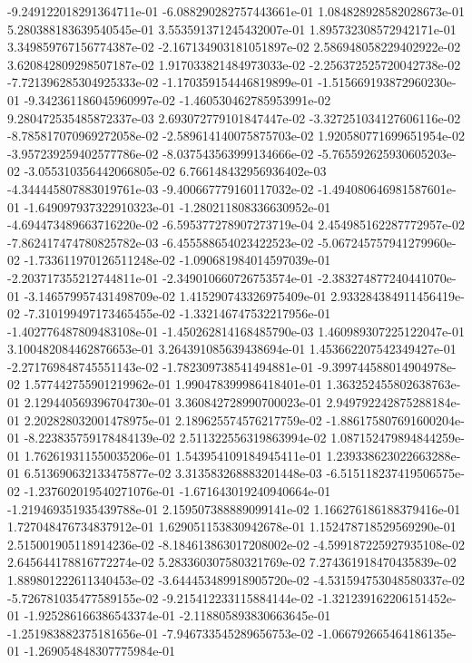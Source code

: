 -9.249122018291364711e-01
-6.088290282757443661e-01
1.084828928582028673e-01
5.280388183639540545e-01
3.553591371245432007e-01
1.895732308572942171e-01
3.349859767156774387e-02
-2.167134903181051897e-02
2.586948058229402922e-02
3.620842809298507187e-02
1.917033821484973033e-02
-2.256372525720042738e-02
-7.721396285304925333e-02
-1.170359154446819899e-01
-1.515669193872960230e-01
-9.342361186045960997e-02
-1.460530462785953991e-02
9.280472535485872337e-03
2.693072779101847447e-02
-3.327251034127606116e-02
-8.785817070969272058e-02
-2.589614140075875703e-02
1.920580771699651954e-02
-3.957239259402577786e-02
-8.037543563999134666e-02
-5.765592625930605203e-02
-3.055310356442066805e-02
6.766148432956936402e-03
-4.344445807883019761e-03
-9.400667779160117032e-02
-1.494080646981587601e-01
-1.649097937322910323e-01
-1.280211808336630952e-01
-4.694473489663716220e-02
-6.595377278907273719e-04
2.454985162287772957e-02
-7.862417474780825782e-03
-6.455588654023422523e-02
-5.067245757941279960e-02
-1.733611970126511248e-02
-1.090681984014597039e-01
-2.203717355212744811e-01
-2.349010660726753574e-01
-2.383274877240441070e-01
-3.146579957431498709e-02
1.415290743326975409e-01
2.933284384911456419e-02
-7.310199497173465455e-02
-1.332146747532217956e-01
-1.402776487809483108e-01
-1.450262814168485790e-03
1.460989307225122047e-01
3.100482084462876653e-01
3.264391085639438694e-01
1.453662207542349427e-01
-2.271769848745551143e-02
-1.782309738541494881e-01
-9.399744588014904978e-02
1.577442755901219962e-01
1.990478399986418401e-01
1.363252455802638763e-01
2.129440569396704730e-01
3.360842728990700023e-01
2.949792242875288184e-01
2.202828032001478975e-01
2.189625574576217759e-02
-1.886175807691600204e-01
-8.223835759178484139e-02
2.511322556319863994e-02
1.087152479894844259e-01
1.762619311550035206e-01
1.543954109184945411e-01
1.239338623022663288e-01
6.513690632133475877e-02
3.313583268883201448e-03
-6.515118237419506575e-02
-1.237602019540271076e-01
-1.671643019240940664e-01
-1.219469351935439788e-01
2.159507388889099141e-02
1.166276186188379416e-01
1.727048476734837912e-01
1.629051153830942678e-01
1.152478718529569290e-01
2.515001905118914236e-02
-8.184613863017208002e-02
-4.599187225927935108e-02
2.645644178816772274e-02
5.283360307580321769e-02
7.274361918470435839e-02
1.889801222611340453e-02
-3.644453489918905720e-02
-4.531594753048580337e-02
-5.726781035477589155e-02
-9.215412233115884144e-02
-1.321239162206151452e-01
-1.925286166386543374e-01
-2.118805893830663645e-01
-1.251983882375181656e-01
-7.946733545289656753e-02
-1.066792665464186135e-01
-1.269054848307775984e-01
